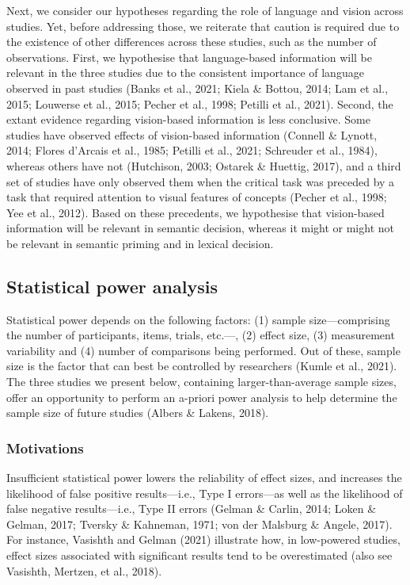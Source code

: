 \documentclass[
  12pt,
  man,floatsintext]{apa7}
\begin{document}
Next, we consider our hypotheses regarding the role of language and vision across studies. Yet, before addressing those, we reiterate that caution is required due to the existence of other differences across these studies, such as the number of observations. First, we hypothesise that language-based information will be relevant in the three studies due to the consistent importance of language observed in past studies (Banks et al., 2021; Kiela \& Bottou, 2014; Lam et al., 2015; Louwerse et al., 2015; Pecher et al., 1998; Petilli et al., 2021). Second, the extant evidence regarding vision-based information is less conclusive. Some studies have observed effects of vision-based information (Connell \& Lynott, 2014; Flores d'Arcais et al., 1985; Petilli et al., 2021; Schreuder et al., 1984), whereas others have not (Hutchison, 2003; Ostarek \& Huettig, 2017), and a third set of studies have only observed them when the critical task was preceded by a task that required attention to visual features of concepts (Pecher et al., 1998; Yee et al., 2012). Based on these precedents, we hypothesise that vision-based information will be relevant in semantic decision, whereas it might or might not be relevant in semantic priming and in lexical decision.

\hypertarget{statistical-power-analysis}{%
\subsection{Statistical power analysis}\label{statistical-power-analysis}}

Statistical power depends on the following factors: (1) sample size---comprising the number of participants, items, trials, etc.---, (2) effect size, (3) measurement variability and (4) number of comparisons being performed. Out of these, sample size is the factor that can best be controlled by researchers (Kumle et al., 2021). The three studies we present below, containing larger-than-average sample sizes, offer an opportunity to perform an a-priori power analysis to help determine the sample size of future studies (Albers \& Lakens, 2018).

\hypertarget{motivations}{%
\subsubsection{Motivations}\label{motivations}}

Insufficient statistical power lowers the reliability of effect sizes, and increases the likelihood of false positive results---i.e., Type I errors---as well as the likelihood of false negative results---i.e., Type II errors (Gelman \& Carlin, 2014; Loken \& Gelman, 2017; Tversky \& Kahneman, 1971; von der Malsburg \& Angele, 2017). For instance, Vasishth and Gelman (2021) illustrate how, in low-powered studies, effect sizes associated with significant results tend to be overestimated (also see Vasishth, Mertzen, et al., 2018).
\end{document}
